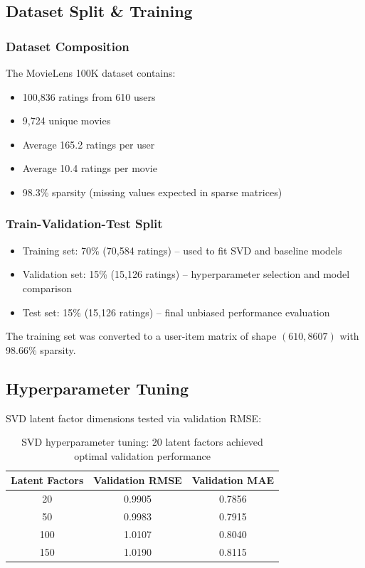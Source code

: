 \documentclass[11pt,a4paper]{article}
\begin{document}
\subsection{Dataset Split \& Training}

\subsubsection{Dataset Composition}

The MovieLens 100K dataset contains:

\begin{itemize}
    \item 100,836 ratings from 610 users
    \item 9,724 unique movies
    \item Average 165.2 ratings per user
    \item Average 10.4 ratings per movie
    \item 98.3\% sparsity (missing values expected in sparse matrices)
\end{itemize}

\subsubsection{Train-Validation-Test Split}

\begin{itemize}
    \item Training set: 70\% (70,584 ratings) – used to fit SVD and baseline models
    \item Validation set: 15\% (15,126 ratings) – hyperparameter selection and model comparison
    \item Test set: 15\% (15,126 ratings) – final unbiased performance evaluation
\end{itemize}

The training set was converted to a user-item matrix of shape $(610, 8607)$ with 98.66\% sparsity.

\subsection{Hyperparameter Tuning}

SVD latent factor dimensions tested via validation RMSE:

\begin{table}[H]
\centering
\begin{tabular}{ccc}
\toprule
\textbf{Latent Factors} & \textbf{Validation RMSE} & \textbf{Validation MAE} \\
\midrule
20  & 0.9905 & 0.7856 \\
50  & 0.9983 & 0.7915 \\
100 & 1.0107 & 0.8040 \\
150 & 1.0190 & 0.8115 \\
\bottomrule
\end{tabular}
\caption{SVD hyperparameter tuning: 20 latent factors achieved optimal validation performance}
\label{tab:svd_tuning}
\end{table}
\end{document}
